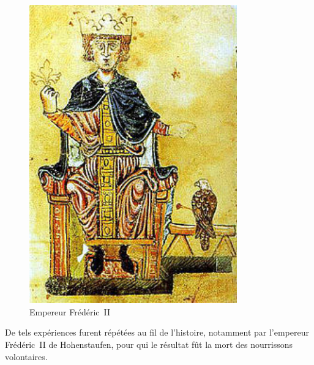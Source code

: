 \begin{minipage}[H]{0.49\linewidth}
  \begin{figure}[H]
  \centering
  \includegraphics[width=0.8\textwidth]{../resources/illustrations/fred-II}
  \caption{Empereur Frédéric~II}
  \end{figure}
\end{minipage}
\begin{minipage}[H]{0.5\linewidth}
De tels expériences furent répétées au fil de l'histoire, notamment par l'empereur Frédéric~II de Hohenstaufen, pour qui le résultat fût la mort des nourrissons volontaires\cite{ggcoulton-francis-to-dante}. 
\end{minipage}

